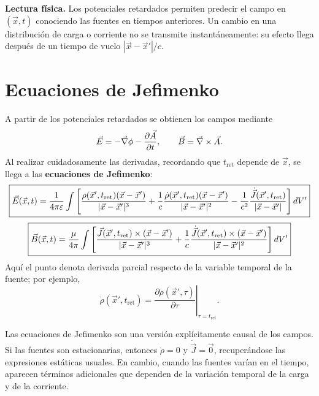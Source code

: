 \documentclass[../main.tex]{subfiles}
\begin{document}
\begin{cajaidea}
\textbf{Lectura física.} Los potenciales retardados permiten predecir el campo en $(\vec x,t)$ conociendo las fuentes en tiempos anteriores. Un cambio en una distribución de carga o corriente no se transmite instantáneamente: su efecto llega después de un tiempo de vuelo $|\vec x-\vec x'|/c$.
\end{cajaidea}

\section{Ecuaciones de Jefimenko}
\label{subsec:ecuaciones-jefimenko}

A partir de los potenciales retardados se obtienen los campos mediante
\begin{equation*}
    \vec{E}=-\vec\nabla\phi-\frac{\partial\vec A}{\partial t},
    \qquad
    \vec{B}=\vec\nabla\times\vec A.
\end{equation*}
Al realizar cuidadosamente las derivadas, recordando que $t_{\mathrm{ret}}$ depende de $\vec x$, se llega a las \textbf{ecuaciones de Jefimenko}:
\begin{equation}
    \boxed{
    \vec{E}(\vec x,t)=\frac{1}{4\pi\varepsilon}\int
    \left[
    \frac{\rho(\vec x',t_{\mathrm{ret}})(\vec x-\vec x')}{|\vec x-\vec x'|^3}
    +\frac{1}{c}\frac{\dot\rho(\vec x',t_{\mathrm{ret}})(\vec x-\vec x')}{|\vec x-\vec x'|^2}
    -\frac{1}{c^2}\frac{\dot{\vec J}(\vec x',t_{\mathrm{ret}})}{|\vec x-\vec x'|}
    \right]dV'
    }
    \label{eq:rad-jefimenko-E}
\end{equation}
\begin{equation}
    \boxed{
    \vec{B}(\vec x,t)=\frac{\mu}{4\pi}\int
    \left[
    \frac{\vec J(\vec x',t_{\mathrm{ret}})\times(\vec x-\vec x')}{|\vec x-\vec x'|^3}
    +\frac{1}{c}\frac{\dot{\vec J}(\vec x',t_{\mathrm{ret}})\times(\vec x-\vec x')}{|\vec x-\vec x'|^2}
    \right]dV'
    }
    \label{eq:rad-jefimenko-B}
\end{equation}
Aquí el punto denota derivada parcial respecto de la variable temporal de la fuente; por ejemplo,
\begin{equation*}
    \dot\rho(\vec x',t_{\mathrm{ret}})=
    \left.\frac{\partial\rho(\vec x',\tau)}{\partial\tau}\right|_{\tau=t_{\mathrm{ret}}}.
\end{equation*}

Las ecuaciones de Jefimenko son una versión explícitamente causal de los campos. Si las fuentes son estacionarias, entonces $\dot\rho=0$ y $\dot{\vec J}=\vec 0$, recuperándose las expresiones estáticas usuales. En cambio, cuando las fuentes varían en el tiempo, aparecen términos adicionales que dependen de la variación temporal de la carga y de la corriente.
\end{document}

